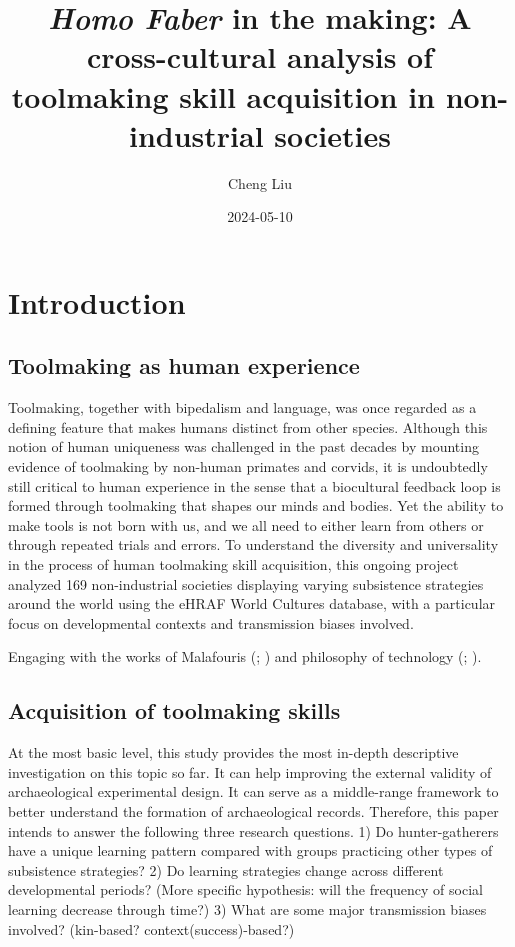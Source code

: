 \documentclass[
  11pt,
]{article}
\title{\emph{Homo Faber} in the making: A cross-cultural analysis of toolmaking skill acquisition in non-industrial societies}
\author{Cheng Liu}
\date{2024-05-10}
\begin{document}
\maketitle

{
\hypersetup{linkcolor=}
\setcounter{tocdepth}{2}
\tableofcontents
}
\section{Introduction}\label{introduction}

\subsection{Toolmaking as human experience}\label{toolmaking-as-human-experience}

Toolmaking, together with bipedalism and language, was once regarded as a defining feature that makes humans distinct from other species. Although this notion of human uniqueness was challenged in the past decades by mounting evidence of toolmaking by non-human primates and corvids, it is undoubtedly still critical to human experience in the sense that a biocultural feedback loop is formed through toolmaking that shapes our minds and bodies. Yet the ability to make tools is not born with us, and we all need to either learn from others or through repeated trials and errors. To understand the diversity and universality in the process of human toolmaking skill acquisition, this ongoing project analyzed 169 non-industrial societies displaying varying subsistence strategies around the world using the eHRAF World Cultures database, with a particular focus on developmental contexts and transmission biases involved.

Engaging with the works of Malafouris (; ) and philosophy of technology (; ).

\subsection{Acquisition of toolmaking skills}\label{acquisition-of-toolmaking-skills}

At the most basic level, this study provides the most in-depth descriptive investigation on this topic so far. It can help improving the external validity of archaeological experimental design. It can serve as a middle-range framework to better understand the formation of archaeological records. Therefore, this paper intends to answer the following three research questions. 1) Do hunter-gatherers have a unique learning pattern compared with groups practicing other types of subsistence strategies? 2) Do learning strategies change across different developmental periods? (More specific hypothesis: will the frequency of social learning decrease through time?) 3) What are some major transmission biases involved? (kin-based? context(success)-based?)
\end{document}
